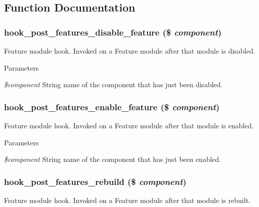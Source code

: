 \subsection{Function Documentation}
\hypertarget{group__features__module__hooks_ga4a6a8c00bd960ec796014920561ca9b9}{
\subsubsection[{hook\_\-post\_\-features\_\-disable\_\-feature}]{\setlength{\rightskip}{0pt plus 5cm}hook\_\-post\_\-features\_\-disable\_\-feature (\$ {\em component})}}
\label{group__features__module__hooks_ga4a6a8c00bd960ec796014920561ca9b9}
Feature module hook. Invoked on a Feature module after that module is disabled.


\begin{DoxyParams}{Parameters}
\item[{\em \$component}]String name of the component that has just been disabled. \end{DoxyParams}
\hypertarget{group__features__module__hooks_ga1a213ea8ab58bc38bc9064ee0e5ecffd}{
\subsubsection[{hook\_\-post\_\-features\_\-enable\_\-feature}]{\setlength{\rightskip}{0pt plus 5cm}hook\_\-post\_\-features\_\-enable\_\-feature (\$ {\em component})}}
\label{group__features__module__hooks_ga1a213ea8ab58bc38bc9064ee0e5ecffd}
Feature module hook. Invoked on a Feature module after that module is enabled.


\begin{DoxyParams}{Parameters}
\item[{\em \$component}]String name of the component that has just been enabled. \end{DoxyParams}
\hypertarget{group__features__module__hooks_gafc175b1136fef7d44bb5ebd25aea01ac}{
\subsubsection[{hook\_\-post\_\-features\_\-rebuild}]{\setlength{\rightskip}{0pt plus 5cm}hook\_\-post\_\-features\_\-rebuild (\$ {\em component})}}
\label{group__features__module__hooks_gafc175b1136fef7d44bb5ebd25aea01ac}
Feature module hook. Invoked on a Feature module after that module is rebuilt.



